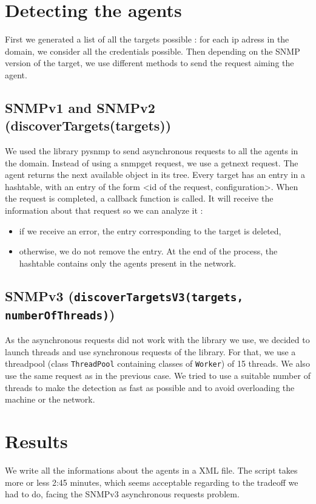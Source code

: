 \documentclass[a4paper,titlepage]{article}
\begin{document}
\section{Detecting the agents}
First we generated a list of all the targets possible : for each ip adress in the domain, we consider all the credentials possible.  Then depending on the SNMP version of the target, we use different methods to send the request aiming the agent. 
	
	\subsection{SNMPv1 and SNMPv2 (discoverTargets(targets))}
	We used the library pysnmp to send asynchronous requests to all the agents in the domain. Instead of using a snmpget request, we use a getnext request. The agent returns the next available object in its tree. Every target has an entry in a hashtable, with an entry of the form <id of the request, configuration>. When the request is completed, a callback function is called. It will receive the information about that request so we can analyze it :
	\begin{itemize}
	 	\item if we receive an error, the entry corresponding to the target is deleted,
	 	\item otherwise, we do not remove the entry. At the end of the process, the hashtable contains only the agents present in the network.
	 \end{itemize}  


	\subsection{SNMPv3 (\texttt{discoverTargetsV3(targets, numberOfThreads)})}
	As the asynchronous requests did not work with the library we use, we decided to launch threads and use synchronous requests of the library. 
	For that, we use a threadpool (class \texttt{ThreadPool} containing classes of \texttt{Worker}) of 15 threads. We also use the same request as in the previous case. We tried to use a suitable number of threads to make the detection as fast as possible and to avoid overloading the machine or the network.


\section{Results}
We write all the informations about the agents in a XML file. The script takes more or less 2:45 minutes, which seems acceptable regarding to the tradeoff we had to do, facing the SNMPv3 asynchronous requests problem.
\end{document}

